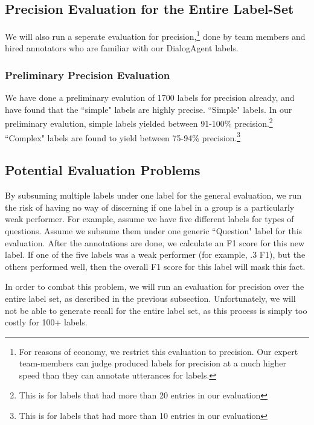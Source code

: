 \subsection{Precision Evaluation for the Entire Label-Set}

We will also run a seperate evaluation for precision,\footnote{For reasons of
economy, we restrict this evaluation to precision. Our expert team-members can
judge produced labels for precision at a much higher speed than they can
annotate utterances for labels.} done by team members and hired annotators who
are familiar with our DialogAgent labels.


\subsubsection{Preliminary Precision Evaluation} 
We have done a preliminary evalution of 1700 labels for precision already, and have found that the ``simple" labels are highly precise.
``Simple" labels. In our preliminary evalution, simple labels yielded between 91-100\% precision.\footnote{This is for labels that had more than 20 entries in our evaluation}
``Complex" labels are found to yield between 75-94\% precision.\footnote{This is for labels that had more than 10 entries in our evaluation}

\subsection{Potential Evaluation Problems}

By subsuming multiple labels under one label for the general evaluation, we run
the risk of having no way of discerning if one label in a group is a
particularly weak performer. For example, assume we have five different labels
for types of questions. Assume we subsume them under one generic ``Question"
label for this evaluation. After the annotations are done, we calculate an F1
score for this new label. If one of the five labels was a weak performer (for
example, .3 F1), but the others performed well, then the overall F1 score for
this label will mask this fact. 

In order to combat this problem, we will run an evaluation for precision over
the entire label set, as described in the previous subsection. Unfortunately,
we will not be able to generate recall for the entire label set, as this
process is simply too costly for 100+ labels.
